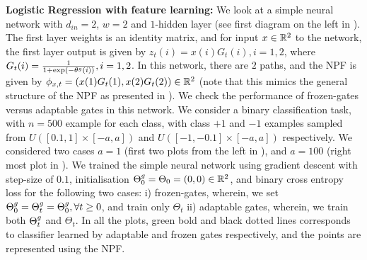 \textbf{Logistic Regression with feature learning:} We look at a simple neural network with $d_{in}=2$, $w=2$ and $1$-hidden layer (see first diagram on the left in ). The first layer weights is an identity matrix, and for input $x\in\mathbb{R}^2$ to the network, the first layer output is given by $z_{t}(i)=x(i)G_t(i),i=1,2$, where $G_t(i)=\frac{1}{1+\exp(-\theta^g(i))},i=1,2$. In this network, there are $2$ paths, and the NPF is given by $\phi_{x,t}=(x(1)G_t(1),x(2)G_t(2))\in \mathbb{R}^2$ (note that this mimics the general structure of the NPF as presented in ).
We check the performance of frozen-gates versus adaptable gates in this network. We consider a binary classification task, with $n=500$ example for each class, with class $+1$ and $-1$ examples sampled from $U([0.1,1]\times [-a,a])$ and $U([-1,-0.1]\times[-a,a])$ respectively. We considered two cases $a=1$ (first two plots from the left in ), and $a=100$ (right most plot in ). 
We trained the simple neural network using gradient descent with step-size of $0.1$, initialisation ${\Theta}^g_0=\Theta_0=(0,0)\in\mathbb{R}^2$, and binary cross entropy loss for the following two cases: i) frozen-gates, wherein, we set ${\Theta}^g_0={\Theta}^g_t={\Theta}^g_0,\forall t\geq 0$, and train only $\Theta_t$ ii) adaptable gates, wherein, we train both ${\Theta}^g_t$ and $\Theta_t$. In all the plots, green bold and black dotted lines corresponds to classifier learned  by adaptable and frozen gates respectively, and the points are represented using the NPF.\\
